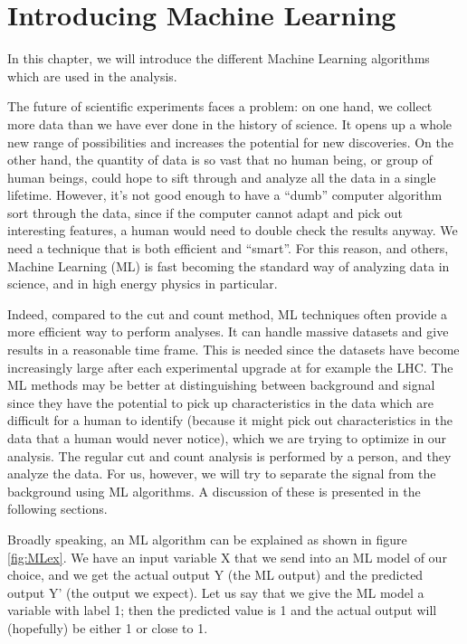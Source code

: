 \chapter{Introducing Machine Learning}
\label{sec:ML}
In this chapter, we will introduce the different Machine Learning algorithms which are used in the analysis. 

The future of scientific experiments faces a problem: on one hand, we collect more data than we have ever done in the history of science. It opens up a whole new range of possibilities and increases the potential for new discoveries. On the other hand, the quantity of data is so vast that no human being, or group of human beings, could hope to sift through and analyze all the data in a single lifetime. However, it's not good enough to have a ``dumb'' computer algorithm sort through the data, since if the computer cannot adapt and pick out interesting features, a human would need to double check the results anyway. We need a technique that is both efficient and ``smart''. For this reason, and others, Machine Learning (ML) is fast becoming the standard way of analyzing data in science, and in high energy physics in particular. 

Indeed, compared to the cut and count method, ML techniques often provide a more efficient way to perform analyses. It can handle massive datasets and give results in a reasonable time frame. This is needed since the datasets have become increasingly large after each experimental upgrade at for example the LHC. The ML methods may be better at distinguishing between background and signal since they have the potential to pick up characteristics in the data which are difficult for a human to identify (because it might pick out characteristics in the data that a human would never notice), which we are trying to optimize in our analysis. The regular cut and count analysis is performed by a person, and they analyze the data. For us, however, we will try to separate the signal from the background using ML algorithms. A discussion of these is presented in the following sections. 

Broadly speaking, an ML algorithm can be explained as shown in figure \ref{fig:MLex}. We have an input variable X that we send into an ML model of our choice, and we get the actual output Y (the ML output) and the predicted output Y' (the output we expect). Let us say that we give the ML model a variable with label 1; then the predicted value is 1 and the actual output will (hopefully) be either 1 or close to 1.   

